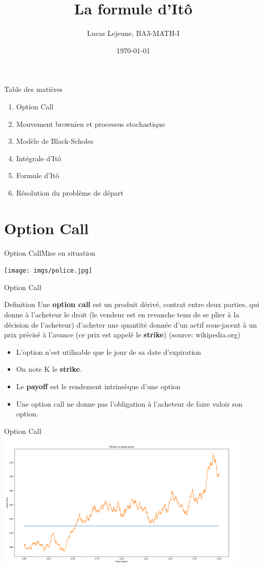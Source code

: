 \documentclass{beamer}
\title{La formule d'Itô}
\date{\today}
\author{Lucas Lejeune, BA3-MATH-I}
\newcommand{\1}{\mathmybb{1}}
\begin{document}
\frame{\titlepage}

\begin{frame}{Table des matières}
  \begin{enumerate}
    \item Option Call
    \item Mouvement brownien et processus stochastique
    \item Modèle de Black-Scholes
    \item Intégrale d'Itô
    \item Formule d'Itô
    \item Résolution du problème de départ
  \end{enumerate}
\end{frame}
\section{Option Call}
\begin{frame}{Option Call}{Mise en situation}
  \begin{center}
    \texttt{[image: imgs/police.jpg]}
    \end{center}
\end{frame}
\begin{frame}{Option Call}
  \begin{block}{Definition}
    Une \textbf{option call} est un produit dérivé, contrat entre deux parties, qui donne à l'acheteur le droit (le vendeur est en revanche tenu de se plier à la décision de l'acheteur) d'acheter une quantité donnée d'un actif sous-jacent à un prix précisé à l'avance (ce prix est appelé le \textbf{strike}) (source: wikipedia.org)
  \end{block}
  \pause
  \begin{itemize}
  \item L'option n'est utilisable que le jour de sa date d'expiration
  \item On note K le \textbf{strike}.
  \item Le \textbf{payoff} est le rendement intrinsèque d'une option
    \item Une option call ne donne pas l'obligation à l'acheteur de faire valoir son option.
  \end{itemize}
\end{frame}
\begin{frame}{Option Call}
  \includegraphics[width=12cm]{imgs/strike.png}
\end{frame}
\end{document}
